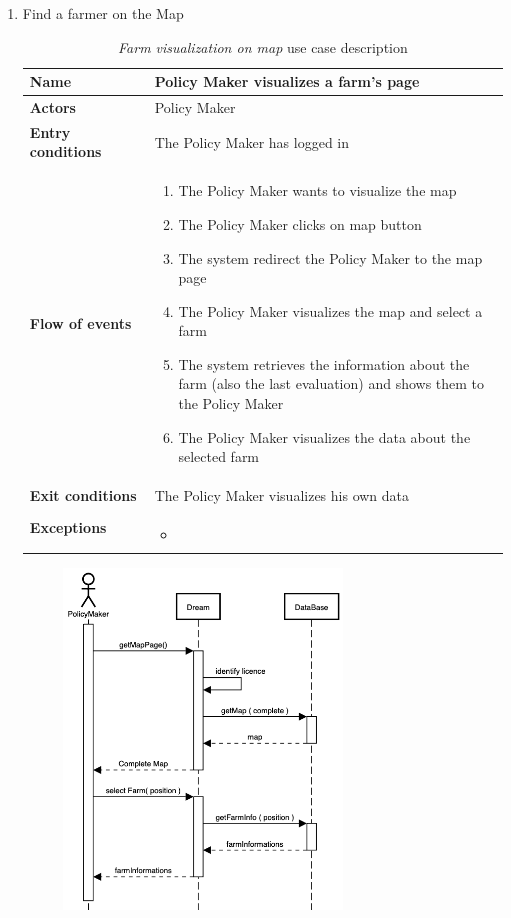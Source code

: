 \begin{enumerate}
    \item Find a farmer on the Map
    \begin{longtable}{p{0.26\linewidth}p{0.75\linewidth}}
        \toprule
        \textbf{Name} & \textbf{Policy Maker visualizes a farm’s page} \\
        \midrule
        \textbf{Actors} & Policy Maker \\
        \midrule
        \textbf{Entry conditions} & The Policy Maker has logged in\\
        \midrule
        \textbf{Flow of events} & 
        \begin{enumerate}
            \item The Policy Maker wants to visualize the map
            \item The Policy Maker clicks on map button
            \item The system redirect the Policy Maker to the map page
            \item The Policy Maker visualizes the map and select a farm
            \item The system retrieves the information about the farm (also the last evaluation) and shows them to the Policy Maker
            \item The Policy Maker visualizes the data about the selected farm
        \end{enumerate} \\
        \midrule
        \textbf{Exit conditions} & The Policy Maker visualizes his own data\\
        \midrule
        \textbf{Exceptions} & 
        \begin{itemize}
            \item 
        \end{itemize}\\
        \bottomrule
        \caption{\emph{Farm visualization on map} use case description}
    \end{longtable}
    \begin{figure}[H]
        \begin{center}
        \includegraphics[width=0.7\textwidth]{sequence/searchOnMap.png}

\end{center}
\end{figure}
\end{enumerate}
